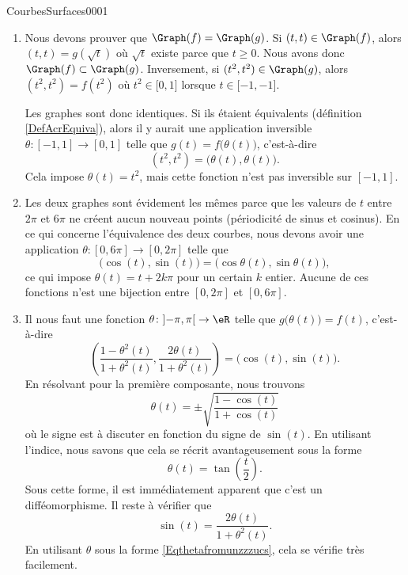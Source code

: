 \begin{corrige}{CourbesSurfaces0001}

	\begin{enumerate}
		\item
			Nous devons prouver que $\Graph(f)=\Graph(g)$. Si $(t,t)\in \Graph(f)$, alors $(t,t)=g(\sqrt{t})$ où $\sqrt{t}$ existe parce que $t\geq 0$. Nous avons donc $\Graph(f)\subset\Graph(g)$. Inversement, si $(t^2,t^2)\in\Graph(g)$, alors $(t^2,t^2)=f(t^2)$ où $t^2\in\mathopen[ 0 , 1 \mathclose]$ lorsque $t\in\mathopen[ -1 , -1 \mathclose]$.

			Les graphes sont donc identiques. Si ils étaient équivalents (définition \ref{DefAcrEquiva}), alors il y aurait une application inversible $\theta\colon [-1,1]\to [0,1]$ telle que $g(t)=f\big( \theta(t) \big)$, c'est-à-dire
			\begin{equation}
				(t^2,t^2)=\big( \theta(t),\theta(t) \big).
			\end{equation}
			Cela impose $\theta(t)=t^2$, mais cette fonction n'est pas inversible sur $[-1,1]$.

		\item
			Les deux graphes sont évidement les mêmes parce que les valeurs de $t$ entre $2\pi$ et $6\pi$ ne créent aucun nouveau points (périodicité de sinus et cosinus). En ce qui concerne l'équivalence des deux courbes, nous devons avoir une application $\theta\colon [0,6\pi]\to [0,2\pi]$ telle que
			\begin{equation}
				\big( \cos(t),\sin(t) \big)=\big( \cos\theta(t),\sin\theta(t) \big),
			\end{equation}
			ce qui impose $\theta(t)=t+2k\pi$ pour un certain $k$ entier. Aucune de ces fonctions n'est une bijection entre $[0,2\pi]$ et $[0,6\pi]$.
		\item
			Il nous faut une fonction $\theta\colon \mathopen] -\pi , \pi \mathclose[\to \eR$ telle que $g\big( \theta(t) \big)=f(t)$, c'est-à-dire
			\begin{equation}
				\left( \frac{ 1-\theta^2(t) }{ 1+\theta^2(t) },\frac{ 2\theta(t) }{ 1+\theta^2(t) } \right)=\big( \cos(t),\sin(t) \big).
			\end{equation}
			En résolvant pour la première composante, nous trouvons
            \begin{equation}        \label{Eqthetafromunzzzucs}
				\theta(t)=\pm\sqrt{\frac{ 1-\cos(t) }{ 1+\cos(t) }}
			\end{equation}
            où le signe est à discuter en fonction du signe de \( \sin(t)\). En utilisant l'indice, nous savons que cela se récrit avantageusement sous la forme
            \begin{equation}
                \theta(t)=\tan\left( \frac{ t }{2} \right).
            \end{equation}
            Sous cette forme, il est immédiatement apparent que c'est un difféomorphisme. Il reste à vérifier que
            \begin{equation}
                \sin(t)=\frac{ 2\theta(t) }{ 1+\theta^2(t) }.
            \end{equation}
            En utilisant \( \theta\) sous la forme \eqref{Eqthetafromunzzzucs}, cela se vérifie très facilement.


\end{enumerate}
\end{corrige}
